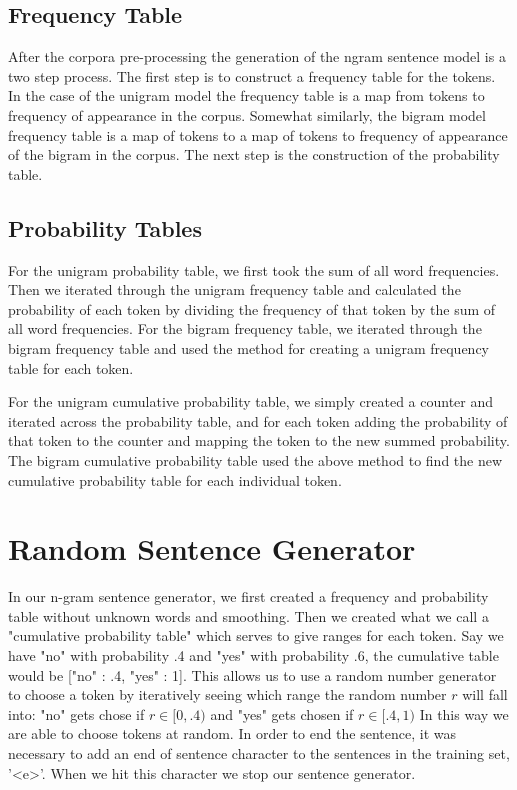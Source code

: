 \documentclass[11pt]{article}
\begin{document}
\subsection{Frequency Table}
After the corpora pre-processing the generation of the ngram sentence model is a two step process. The first step is to construct a frequency table for the tokens. In the case of the unigram model the frequency table is a map from tokens to frequency of appearance in the corpus. Somewhat similarly, the bigram model frequency table is a map of tokens to a map of tokens to frequency of appearance of the bigram in the corpus. The next step is the construction of the probability table.

\subsection{Probability Tables}
For the unigram probability table, we first took the sum of all word frequencies. Then we iterated through the unigram frequency table and calculated the probability of each token by dividing the frequency of that token by the sum of all word frequencies. For the bigram frequency table, we iterated through the bigram frequency table and used the method for creating a unigram frequency table for each token.

For the unigram cumulative probability table, we simply created a counter and iterated across the probability table, and for each token adding the probability of that token to the counter and mapping the token to the new summed probability. The bigram cumulative probability table used the above method to find the new cumulative probability table for each individual token.

\section{Random Sentence Generator}
In our n-gram sentence generator, we first created a frequency and probability table without unknown words and smoothing. Then we created what we call a "cumulative probability table" which serves to give ranges for each token. Say we have "no" with probability .4 and "yes" with probability .6, the cumulative table would be ["no" : .4, "yes" : 1]. This allows us to use a random number generator to choose a token by iteratively seeing which range the random number $r$ will fall into: "no" gets chose if $ r \in [0, .4)$ and "yes" gets chosen if $r \in [.4, 1)$ In this way we are able to choose tokens at random. In order to end the sentence, it was necessary to add an end of sentence character to the sentences in the training set, '<e>'. When we hit this character we stop our sentence generator.
\end{document}
